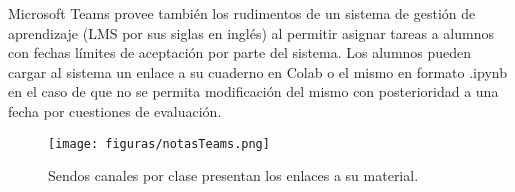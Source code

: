 Microsoft Teams provee también los rudimentos de un sistema de gestión de aprendizaje (LMS por sus siglas en inglés) al permitir asignar tareas a alumnos con fechas límites de aceptación por parte del sistema. Los alumnos pueden cargar al sistema un enlace a su cuaderno en Colab o el mismo en formato .ipynb en el caso de que no se permita modificación del mismo con posterioridad a una fecha por cuestiones de evaluación.

\begin{figure}[!ht]
\centering
\texttt{[image: figuras/notasTeams.png]}
\caption{Sendos canales por clase presentan los enlaces a su material.}
\label{fig:teams}
\end{figure}